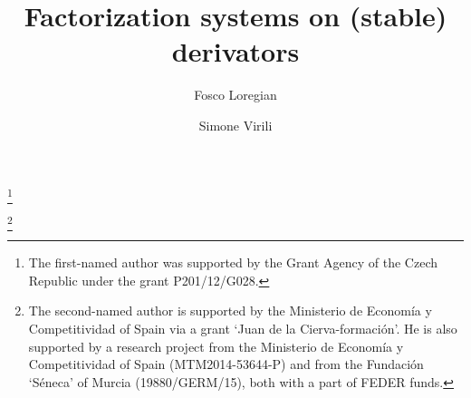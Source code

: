\title{Factorization systems on (stable) derivators}
\author{Fosco Loregian}
\address{%
\textsf{Fosco Loregian}: \newline
Centro de Matemática da Universidade de Coimbra \newline
Apartado 3008, EC Santa Cruz  - 501 Coimbra, Portugal \newline
\href{mailto:fosco.loregian@mat.uc.pt}
     {\sf fosco.loregian@mat.uc.pt}}
\thanks{ The first-named author was supported by the Grant Agency of the
         Czech Republic under the grant \textsc{P}201/12/\textsc{G}028.  }

\author[Simone Virili]{Simone Virili}
\address{
\textsf{Simone Virili}: \newline
Facultad de Matem\'aticas, Universidad de Murcia \newline
Campus Espinardo, , Murcia.  \newline
\href{mailto:virili.simone@gmail.com}
     {\sf virili.simone@gmail.com}}
\thanks{The second-named author is supported by the Ministerio de Econom\'ia y
Competitividad of Spain via a grant `Juan de la Cierva-formaci\'on'. He is also
supported by a research project from the Ministerio de Econom\'ia y
Competitividad of Spain (MTM2014-53644-P) and from the Fundaci\'on `S\'eneca'
of Murcia (19880/GERM/15), both with a part of FEDER funds.}

